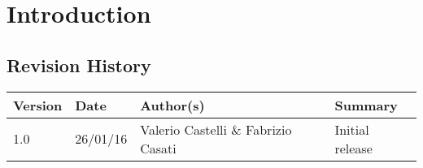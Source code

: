 \chapter{Introduction}
\section{Revision History}
\begin{center}
\begin{longtable}{|l|l|l|l|}
\hline
Version &
Date &
Author(s) &
Summary \\
\hline
1.0 &
26/01/16 &
Valerio Castelli \& Fabrizio Casati &
Initial release \\
\hline
\end{longtable}
\end{center}